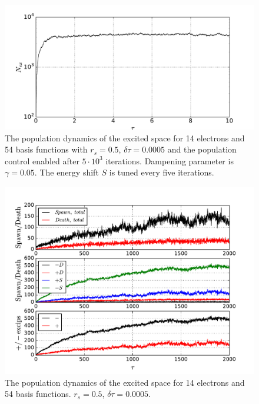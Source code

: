 \documentclass[twoside,english]{uiofysmaster}
\begin{document}
\begin{figure}[ht!]
	\centering
	\includegraphics[width=0.8\linewidth]{Nex20000}
	\caption{The population dynamics of the excited space for 14 electrons and 54 basis functions with $r_s=0.5$, $\delta \tau=0.0005$ and the population control enabled after $5\cdot 10^3$ iterations. Dampening parameter is $\gamma = 0.05$. The energy shift $S$ is tuned every five iterations.}
	\label{fig:nx20k}
\end{figure}






\begin{landscape}

\begin{figure}[ht!]
	\centering
	\includegraphics[width=0.8\linewidth]{platFind}
	\caption{The population dynamics of the excited space for 14 electrons and 54 basis functions. $r_s=0.5$, $\delta \tau=0.0005$.}
	\label{fig:platFind}
\end{figure}

\end{landscape}
\end{document}

